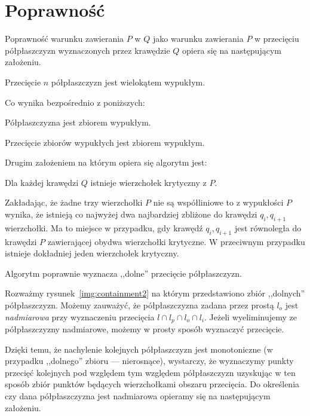 \section{Poprawność}
Poprawność warunku zawierania $P$ w $Q$ jako warunku zawierania $P$ w
przecięciu półpłaszczyzn wyznaczonych przez krawędzie $Q$ opiera się
na następującym założeniu.

\begin{lemat}
  Przecięcie $n$ półpłaszczyzn jest wielokątem wypukłym.
\end{lemat}

Co wynika bezpośrednio z poniższych:

\begin{twierdzenie}
  Półpłaszczyzna jest zbiorem wypukłym.
\end{twierdzenie}

\begin{twierdzenie}
  Przecięcie zbiorów wypukłych jest zbiorem wypukłym.
\end{twierdzenie}

Drugim założeniem na którym opiera się algorytm jest:

\begin{lemat}
  Dla każdej krawędzi $Q$ istnieje wierzchołek krytyczny z $P$.
\end{lemat}

Zakładając, że żadne trzy wierzchołki $P$ nie są współliniowe to z
wypukłości $P$ wynika, że istnieją co najwyżej dwa najbardziej
zbliżone do krawędzi $q_i,q_{i+1}$ wierzchołki. Ma to miejsce w
przypadku, gdy krawędź $q_i,q_{i+1}$ jest równoległa do krawędzi $P$
zawierającej obydwa wierzchołki krytyczne. W przeciwnym przypadku
istnieje dokładniej jeden wierzchołek krytyczny.

\begin{lemat}
  Algorytm poprawnie wyznacza ,,dolne'' przecięcie półpłaszczyzn.
\end{lemat}

Rozważmy rysunek~\ref{img:containment2} na którym przedstawiono zbiór
,,dolnych'' półpłaszczyzn. Możemy zauważyć, że półpłaszczyzna zadana
przez prostą $l_o$ jest \emph{nadmiarowa} przy wyznaczeniu przecięcia
$l \cap l_p \cap l_o \cap l_i$. Jeżeli wyeliminujemy ze półpłaszczyzny
nadmiarowe, możemy w prosty sposób wyznaczyć przecięcie.

Dzięki temu, że nachylenie kolejnych półpłaszczyzn jest monotoniczne
(w przypadku ,,dolnego'' zbioru --- nierosnące), wystarczy, że
wyznaczymy punkty przecięć kolejnych pod względem tym względem
półpłaszczyzn uzyskując w ten sposób zbiór punktów będących
wierzchołkami obszaru przecięcia. Do określenia czy dana
półpłaszczyzna jest nadmiarowa opieramy się na następującym założeniu.

